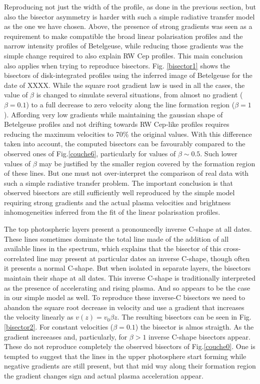 \documentclass{/Users/art2/TeX/aanda/aa}
\begin{document}
Reproducing not just the width of the profile, as done in the previous section, but also the bisector asymmetry is harder with such 
a simple radiative transfer model as the one  we  have chosen. Above, the presence of strong gradients was seen as a requirement to make 
compatible the broad linear polarisation profiles and the narrow intensity profiles of Betelgeuse, while reducing those gradients was the
simple change  required to also explain RW Cep profiles. This main conclusion also applies when trying to reproduce bisectors.
 Fig. \ref{bisector1} shows 
the bisectors of disk-integrated profiles using the inferred image of Betelgeuse for the date of XXXX. While the square root gradient law
is used in all the cases, the value of $\beta$ is changed to simulate several situations, from almost no gradient ($\beta=0.1$) to a
 full decrease to zero  velocity along the line formation region ($\beta=1$). Affording very low gradients while maintaining the gaussian shape 
 of Betelgeuse profiles and not drifting towards 
RW Cep-like profiles requires reducing the maximum velocities to 70\% the original values. With this difference taken into account, 
the computed bisectors can be favourably compared to the observed ones of Fig.\ref{couche6}, particularly for values of $\beta \sim 0.5$. 
Such lower values of $\beta$ may be justified by the smaller region covered by the formation region of these lines. But one must 
not over-interpret the comparison of real data with such a simple radiative transfer problem. The important conclusion is that 
observed bisectors are still sufficiently well reproduced by the simple model requiring strong gradients and the actual plasma velocities 
and brightness inhomogeneities inferred from the fit of the linear polarisation profiles. 

The top photospheric layers present a pronouncedly inverse C-shape at all dates. These lines sometimes dominate the total line 
made of the addition of all available lines in the spectrum, which explains that the bisector of this cross-correlated line may present
at particular dates an inverse C-shape,
though often it  presents a normal C-shape. But when isolated in separate layers, the bisectors maintain their shape at all dates. This inverse 
C-shape  is traditionally interpreted as the presence of accelerating and rising plasma. And so appears to be the case in our simple model 
as well. To reproduce these inverse-C bisectors we need to abandon the square root decrease in velocity and use a gradient that increases 
the velocity linearly as $v(z)=v_0\beta z$. The resulting bisectors can be seen in  Fig. \ref{bisector2}. For constant velocities 
($\beta=0.1$) the bisector is almos straigth. As the gradient increeases and, particularly, for $\beta >1$ inverse C-shape bisectors 
appear. These do not reproduce completely the observed bisectors of Fig.\ref{couche0}. One is tempted to suggest that the lines 
  in the upper photosphere start forming while negative gradients are still present, but that mid way along their formation region the gradient 
  changes sign and actual plasma acceleration appear. 
\end{document}
